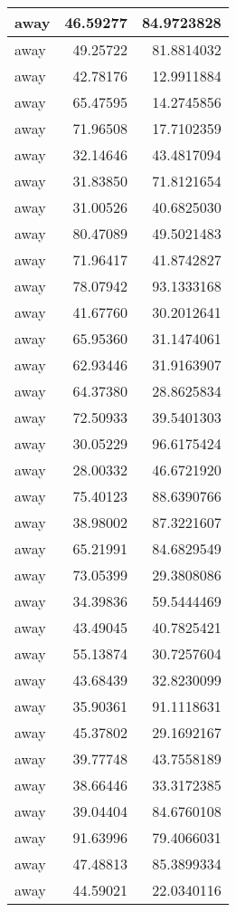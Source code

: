 \documentclass[
]{book}
\theoremstyle{definition}
\theoremstyle{definition}
\theoremstyle{definition}
\theoremstyle{definition}
\theoremstyle{remark}
\begin{document}
\begin{tabular}{l|r|r}
\hline
away & 46.59277 & 84.9723828\\
\hline
away & 49.25722 & 81.8814032\\
\hline
away & 42.78176 & 12.9911884\\
\hline
away & 65.47595 & 14.2745856\\
\hline
away & 71.96508 & 17.7102359\\
\hline
away & 32.14646 & 43.4817094\\
\hline
away & 31.83850 & 71.8121654\\
\hline
away & 31.00526 & 40.6825030\\
\hline
away & 80.47089 & 49.5021483\\
\hline
away & 71.96417 & 41.8742827\\
\hline
away & 78.07942 & 93.1333168\\
\hline
away & 41.67760 & 30.2012641\\
\hline
away & 65.95360 & 31.1474061\\
\hline
away & 62.93446 & 31.9163907\\
\hline
away & 64.37380 & 28.8625834\\
\hline
away & 72.50933 & 39.5401303\\
\hline
away & 30.05229 & 96.6175424\\
\hline
away & 28.00332 & 46.6721920\\
\hline
away & 75.40123 & 88.6390766\\
\hline
away & 38.98002 & 87.3221607\\
\hline
away & 65.21991 & 84.6829549\\
\hline
away & 73.05399 & 29.3808086\\
\hline
away & 34.39836 & 59.5444469\\
\hline
away & 43.49045 & 40.7825421\\
\hline
away & 55.13874 & 30.7257604\\
\hline
away & 43.68439 & 32.8230099\\
\hline
away & 35.90361 & 91.1118631\\
\hline
away & 45.37802 & 29.1692167\\
\hline
away & 39.77748 & 43.7558189\\
\hline
away & 38.66446 & 33.3172385\\
\hline
away & 39.04404 & 84.6760108\\
\hline
away & 91.63996 & 79.4066031\\
\hline
away & 47.48813 & 85.3899334\\
\hline
away & 44.59021 & 22.0340116\\

\end{tabular}
\end{document}
